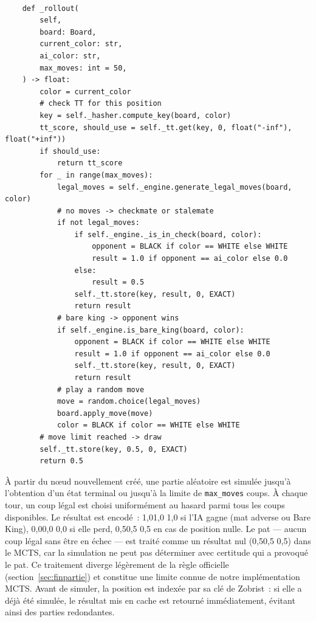 \documentclass[a4paper,11pt]{article}
\begin{document}
\begin{verbatim}

    def _rollout(
        self,
        board: Board,
        current_color: str,
        ai_color: str,
        max_moves: int = 50,
    ) -> float:
        color = current_color
        # check TT for this position
        key = self._hasher.compute_key(board, color)
        tt_score, should_use = self._tt.get(key, 0, float("-inf"), float("+inf"))
        if should_use:
            return tt_score
        for _ in range(max_moves):
            legal_moves = self._engine.generate_legal_moves(board, color)
            # no moves -> checkmate or stalemate
            if not legal_moves:
                if self._engine._is_in_check(board, color):
                    opponent = BLACK if color == WHITE else WHITE
                    result = 1.0 if opponent == ai_color else 0.0
                else:
                    result = 0.5
                self._tt.store(key, result, 0, EXACT)
                return result
            # bare king -> opponent wins
            if self._engine.is_bare_king(board, color):
                opponent = BLACK if color == WHITE else WHITE
                result = 1.0 if opponent == ai_color else 0.0
                self._tt.store(key, result, 0, EXACT)
                return result
            # play a random move
            move = random.choice(legal_moves)
            board.apply_move(move)
            color = BLACK if color == WHITE else WHITE
        # move limit reached -> draw
        self._tt.store(key, 0.5, 0, EXACT)
        return 0.5
        \end{verbatim}

\noindent
À partir du nœud nouvellement créé, une partie aléatoire est simulée jusqu'à
l'obtention d'un état terminal ou jusqu'à la limite de \texttt{max\_moves}
coups. À chaque tour, un coup légal est choisi uniformément au hasard parmi
tous les coups disponibles. Le résultat est encodé~: 1,01{,}0
1,0 si l'IA gagne (mat adverse ou Bare King), 0,00{,}0
0,0 si elle perd, 0,50{,}5
0,5 en cas de position nulle. Le pat --- aucun coup légal sans être en échec 
--- est traité comme un résultat nul (0,50{,}5
0,5) dans le MCTS, car la simulation ne peut pas déterminer avec certitude 
qui a provoqué le pat. Ce traitement diverge légèrement de la règle officielle 
(section~\ref{sec:finpartie}) et constitue une limite connue de notre implémentation MCTS.
Avant de simuler, la position est indexée par sa clé de Zobrist~: si elle
a déjà été simulée, le résultat mis en cache est retourné immédiatement,
évitant ainsi des parties redondantes.
\end{document}
